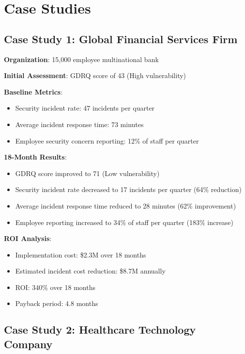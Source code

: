 \documentclass[11pt,a4paper]{article}
\begin{document}
\FloatBarrier

\section{Case Studies}

\subsection{Case Study 1: Global Financial Services Firm}

\textbf{Organization}: 15,000 employee multinational bank

\textbf{Initial Assessment}: GDRQ score of 43 (High vulnerability)

\textbf{Baseline Metrics}:
\begin{itemize}
\item Security incident rate: 47 incidents per quarter
\item Average incident response time: 73 minutes
\item Employee security concern reporting: 12\% of staff per quarter
\end{itemize}

\textbf{18-Month Results}:
\begin{itemize}
\item GDRQ score improved to 71 (Low vulnerability)
\item Security incident rate decreased to 17 incidents per quarter (64\% reduction)
\item Average incident response time reduced to 28 minutes (62\% improvement)
\item Employee reporting increased to 34\% of staff per quarter (183\% increase)
\end{itemize}

\textbf{ROI Analysis}:
\begin{itemize}
\item Implementation cost: \$2.3M over 18 months
\item Estimated incident cost reduction: \$8.7M annually
\item ROI: 340\% over 18 months
\item Payback period: 4.8 months
\end{itemize}

\subsection{Case Study 2: Healthcare Technology Company}
\end{document}
